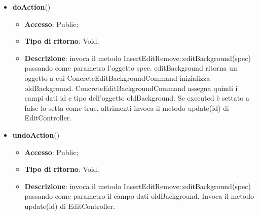 {{{\begin{itemize}
				\begin{itemize}
					\item \textbf{Accesso}: Public;
					\item \textbf{Tipo di ritorno}: Void;
					\item \textbf{Descrizione}: costruisce l’oggetto ConcreteEditBackgroundCommand.
				\end{itemize}
				\item \textbf{doAction}()
				\begin{itemize}
					\item \textbf{Accesso}: Public;
					\item \textbf{Tipo di ritorno}: Void;
					\item \textbf{Descrizione}: invoca il metodo InsertEditRemove::editBackground(spec) passando come parametro l'oggetto spec. editBackground ritorna un oggetto a cui ConcreteEditBackgroundCommand inizializza oldBackground. ConcreteEditBackgroundCommand assegna quindi i campi dati id e tipo dell'oggetto oldBackground. Se executed è settato a false lo setta come true, altrimenti invoca il metodo update(id) di EditController.
				\end{itemize}
				\item \textbf{undoAction}()
				\begin{itemize}
					\item \textbf{Accesso}: Public;
					\item \textbf{Tipo di ritorno}: Void;
					\item \textbf{Descrizione}: invoca il metodo InsertEditRemove::editBackground(spec) passando come parametro il campo dati oldBackground. Invoca il metodo update(id) di EditController.
				\end{itemize}
			\end{itemize}
			}
}}
